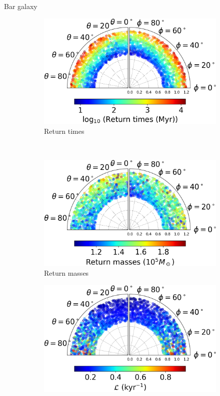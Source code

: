 \documentclass[handout]{beamer}
\begin{document}
\begin{frame}{Bar galaxy}
	\begin{figure}[h]
		\centering
		\begin{subfigure}[t]{0.35\textwidth}
			\includegraphics[width = \textwidth]{"../Files/Week 13/images/22_slides_time"}
			\caption{Return times}
		\end{subfigure}
		~ 
		\begin{subfigure}[t]{0.35\textwidth}
			\includegraphics[width=\textwidth]{"../Files/Week 13/images/22_slides_mass"}
			\caption{Return masses}
		\end{subfigure}
		\begin{subfigure}[t]{0.35\textwidth}
			\includegraphics[width=\textwidth]{"../Files/Week 13/images/22_slides_lyapunov"}

\end{subfigure}
\end{figure}
\end{frame}
\end{document}
